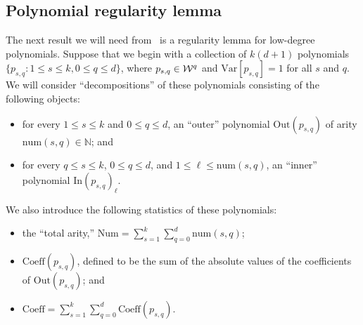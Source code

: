 \documentclass[11pt]{article}
\numberwithin{equation}{section}
\theoremstyle{definition}
\theoremstyle{plain}
\newcommand{\N}{\mathbb N}
\newcommand{\Inner}{\mathrm{In}}
\newcommand{\Outer}{\mathrm{Out}}
\newcommand{\num}{\mathrm{num}}
\newcommand{\Var}{\mathrm{Var}}
\begin{document}
\subsection{Polynomial regularity lemma}

The next result we will need from~\cite{DS14} is a regularity lemma for low-degree polynomials.
Suppose that we begin with a collection of $k(d+1)$ polynomials $\{p_{s,q}: 1 \le s \le k, 0 \le q \le d\}$,
where $p_{s,q} \in {\cal W}^q$ and $\Var[p_{s,q}] = 1$ for all $s$ and $q$. We will consider ``decompositions''
of these polynomials consisting of the following objects:
\begin{itemize}
    \item for every $1 \le s \le k$ and $0 \le q \le d$, an ``outer'' polynomial $\Outer(p_{s,q})$ of arity $\num(s,q) \in \N$; and
    \item for every $q \le s \le k$, $0 \le q \le d$, and $1 \le \ell \le \num(s,q)$, an ``inner'' polynomial $\Inner(p_{s,q})_\ell$.
\end{itemize}
We also introduce the following statistics of these polynomials:
\begin{itemize}
    \item the ``total arity,'' $\mathrm{Num} = \sum_{s=1}^k \sum_{q=0}^d \num(s,q)$;
    \item $\mathrm{Coeff}(p_{s,q})$, defined to be the sum of the absolute values of the coefficients of $\Outer(p_{s,q})$; and
    \item $\mathrm{Coeff} = \sum_{s=1}^k \sum_{q=0}^d \mathrm{Coeff}(p_{s,q})$.
\end{itemize}
\end{document}
